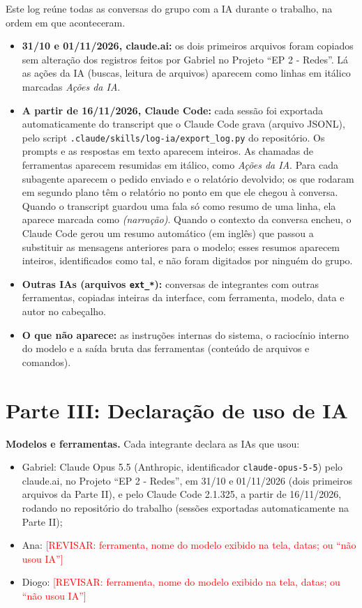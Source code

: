 \documentclass[11pt,a4paper]{article}
\newcommand{\revisar}[1]{\textcolor{red}{[REVISAR: #1]}}
\begin{document}
Este log reúne todas as conversas do grupo com a IA durante o trabalho, na ordem em que aconteceram.
\begin{itemize}
\item \textbf{31/10 e 01/11/2026, claude.ai:} os dois primeiros arquivos foram copiados sem alteração dos registros
  feitos por Gabriel no Projeto ``EP 2 - Redes''. Lá as ações da IA (buscas, leitura de arquivos) aparecem
  como linhas em itálico marcadas \emph{Ações da IA}.
\item \textbf{A partir de 16/11/2026, Claude Code:} cada sessão foi exportada automaticamente do transcript
  que o Claude Code grava (arquivo JSONL), pelo script \texttt{.claude/skills/log-ia/export\_log.py} do
  repositório. Os prompts e as respostas em texto aparecem inteiros. As chamadas de ferramentas aparecem
  resumidas em itálico, como \emph{Ações da IA}. Para cada subagente aparecem o pedido enviado e o relatório
  devolvido; os que rodaram em segundo plano têm o relatório no ponto em que ele chegou à conversa. Quando o
  transcript guardou uma fala só como resumo de uma linha, ela aparece marcada como \emph{(narração)}. Quando o
  contexto da conversa encheu, o Claude Code gerou um resumo automático (em inglês) que passou a substituir as
  mensagens anteriores para o modelo; esses resumos aparecem inteiros, identificados como tal, e não foram
  digitados por ninguém do grupo.
\item \textbf{Outras IAs (arquivos \texttt{ext\_*}):} conversas de integrantes com outras ferramentas, copiadas
  inteiras da interface, com ferramenta, modelo, data e autor no cabeçalho.
\item \textbf{O que não aparece:} as instruções internas do sistema, o raciocínio interno do modelo e a
  saída bruta das ferramentas (conteúdo de arquivos e comandos).
\end{itemize}

\clearpage
{}
\clearpage


\clearpage
\part*{Parte III: Declaração de uso de IA}

\textbf{Modelos e ferramentas.} Cada integrante declara as IAs que usou:
\begin{itemize}
\item Gabriel: Claude Opus 5.5 (Anthropic, identificador \texttt{claude-opus-5-5}) pelo claude.ai, no Projeto ``EP 2 -
  Redes'', em 31/10 e 01/11/2026 (dois primeiros arquivos da Parte II), e pelo Claude Code 2.1.325, a partir de
  16/11/2026, rodando no repositório do trabalho (sessões exportadas automaticamente na Parte II);
\item Ana: \revisar{ferramenta, nome do modelo exibido na tela, datas; ou ``não usou IA''}
\item Diogo: \revisar{ferramenta, nome do modelo exibido na tela, datas; ou ``não usou IA''}
\end{itemize}
\end{document}
